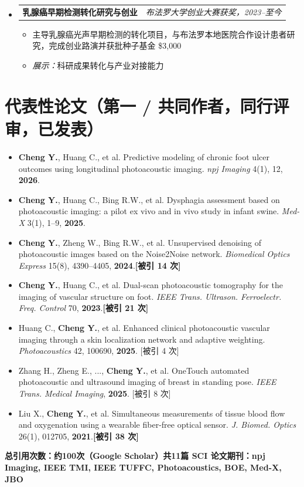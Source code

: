\documentclass[letterpaper,10pt]{article}
\makeatletter
\newcommand{\projheading}[2]{
  \vspace{1pt}\item
  \begin{tabular*}{0.97\textwidth}[t]{l@{\extracolsep{\fill}}r}
    \textbf{#1} & \textit{\small#2} \\
  \end{tabular*}\vspace{2pt}
}
\newcommand{\projItemListStart}{\begin{itemize}[leftmargin=0.2in, topsep=3pt]}
\newcommand{\projItemListEnd}{\end{itemize}\vspace{2pt}}
\makeatother
\begin{document}
\begin{itemize}[leftmargin=0in, label={}]
  \projheading{乳腺癌早期检测转化研究与创业}{布法罗大学创业大赛获奖，2023--至今}
  \projItemListStart
    \item 主导乳腺癌光声早期检测的转化项目，与布法罗本地医院合作设计患者研究，完成创业路演并获批种子基金 \$3,000
    \item \textit{展示：}科研成果转化与产业对接能力
  \projItemListEnd

\end{itemize}

\vspace{-2pt}

\section{代表性论文（第一 / 共同作者，同行评审，已发表）}

\begin{itemize}[leftmargin=0.2in, itemsep=1pt]
  \item \small \textbf{Cheng Y.}, Huang C., et al. Predictive modeling of chronic foot ulcer outcomes using longitudinal photoacoustic imaging. \textit{npj Imaging} 4(1), 12, \textbf{2026}.
  \item \small \textbf{Cheng Y.}, Huang C., Bing R.W., et al. Dysphagia assessment based on photoacoustic imaging: a pilot ex vivo and in vivo study in infant swine. \textit{Med-X} 3(1), 1--9, \textbf{2025}.
  \item \small \textbf{Cheng Y.}, Zheng W., Bing R.W., et al. Unsupervised denoising of photoacoustic images based on the Noise2Noise network. \textit{Biomedical Optics Express} 15(8), 4390--4405, \textbf{2024}.\quad\textbf{[被引 14 次]}
  \item \small \textbf{Cheng Y.}, Huang C., et al. Dual-scan photoacoustic tomography for the imaging of vascular structure on foot. \textit{IEEE Trans. Ultrason. Ferroelectr. Freq. Control} 70, \textbf{2023}.\quad\textbf{[被引 21 次]}
  \item \small Huang C., \textbf{Cheng Y.}, et al. Enhanced clinical photoacoustic vascular imaging through a skin localization network and adaptive weighting. \textit{Photoacoustics} 42, 100690, \textbf{2025}. [被引 4 次]
  \item \small Zhang H., Zheng E., ..., \textbf{Cheng Y.}, et al. OneTouch automated photoacoustic and ultrasound imaging of breast in standing pose. \textit{IEEE Trans. Medical Imaging}, \textbf{2025}. [被引 8 次]
  \item \small Liu X., \textbf{Cheng Y.}, et al. Simultaneous measurements of tissue blood flow and oxygenation using a wearable fiber-free optical sensor. \textit{J. Biomed. Optics} 26(1), 012705, \textbf{2021}.\quad\textbf{[被引 38 次]}
\end{itemize}
\vspace{2pt}
\noindent\small\textbf{总引用次数：约100次（Google Scholar）\quad 共11篇 SCI 论文\quad 期刊：npj Imaging, IEEE TMI, IEEE TUFFC, Photoacoustics, BOE, Med-X, JBO}
\end{document}
